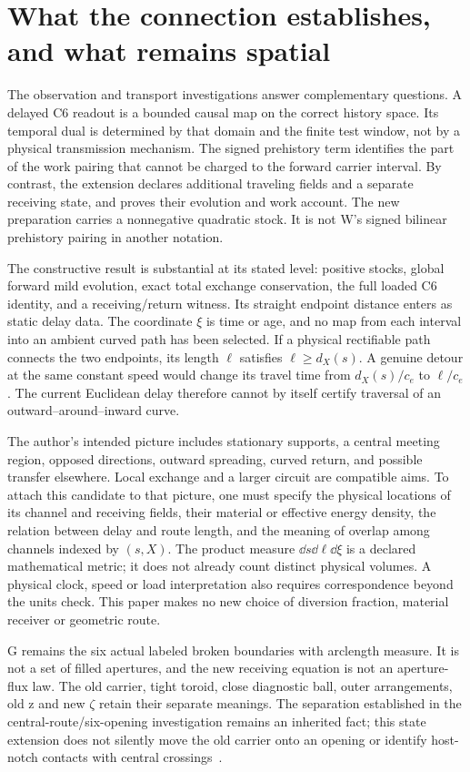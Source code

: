 \section{What the connection establishes, and what remains spatial}\label{sec:discussion}
The observation and transport investigations answer complementary questions. A delayed C6 readout is a bounded causal map on the correct history space. Its temporal dual is determined by that domain and the finite test window, not by a physical transmission mechanism. The signed prehistory term identifies the part of the work pairing that cannot be charged to the forward carrier interval. By contrast, the extension declares additional traveling fields and a separate receiving state, and proves their evolution and work account. The new preparation carries a nonnegative quadratic stock. It is not W's signed bilinear prehistory pairing in another notation.

The constructive result is substantial at its stated level: positive stocks, global forward mild evolution, exact total exchange conservation, the full loaded C6 identity, and a receiving/return witness. Its straight endpoint distance enters as static delay data. The coordinate $\xi$ is time or age, and no map from each interval into an ambient curved path has been selected. If a physical rectifiable path connects the two endpoints, its length $\ell$ satisfies $\ell\ge d_X(s)$. A genuine detour at the same constant speed would change its travel time from $d_X(s)/c_e$ to $\ell/c_e$. The current Euclidean delay therefore cannot by itself certify traversal of an outward--around--inward curve.

The author's intended picture includes stationary supports, a central meeting region, opposed directions, outward spreading, curved return, and possible transfer elsewhere. Local exchange and a larger circuit are compatible aims. To attach this candidate to that picture, one must specify the physical locations of its channel and receiving fields, their material or effective energy density, the relation between delay and route length, and the meaning of overlap among channels indexed by $(s,X)$. The product measure $\dd s\dd\ell\dd\xi$ is a declared mathematical metric; it does not already count distinct physical volumes. A physical clock, speed or load interpretation also requires correspondence beyond the units check. This paper makes no new choice of diversion fraction, material receiver or geometric route.

G remains the six actual labeled broken boundaries with arclength measure. It is not a set of filled apertures, and the new receiving equation is not an aperture-flux law. The old carrier, tight toroid, close diagnostic ball, outer arrangements, old z and new $\zeta$ retain their separate meanings. The separation established in the central-route/six-opening investigation remains an inherited fact; this state extension does not silently move the old carrier onto an opening or identify host-notch contacts with central crossings~\cite{centralpaper,SOreview}.

